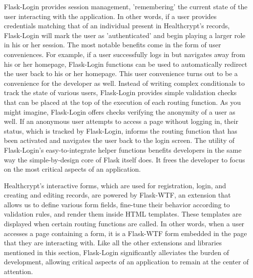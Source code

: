 \documentclass[letterpaper, 10pt,DIV=13]{scrartcl}
\begin{document}
\begin{multicols}{2}
\begin{spacing}{1.25}
Flask-Login provides session management, 'remembering' the current state of the user interacting with the application. In other words, if a user provides credentials matching that of an individual present in Healthcrypt's records, Flask-Login will mark the user as 'authenticated' and begin playing a larger role in his or her session. The most notable benefits come in the form of user conveniences. For example, if a user successfully logs in but navigates away from his or her homepage, Flask-Login functions can be used to automatically redirect the user back to his or her homepage. This user convenience turns out to be a convenience for the developer as well. Instead of writing complex conditionals to track the state of various users, Flask-Login provides simple validation checks that can be placed at the top of the execution of each routing function. As you might imagine, Flask-Login offers checks verifying the anonymity of a user as well. If an anonymous user attempts to access a page without logging in, their status, which is tracked by Flask-Login, informs the routing function that has been activated and navigates the user back to the login screen. The utility of Flask-Login's easy-to-integrate helper functions benefits developers in the same way the simple-by-design core of Flask itself does. It frees the developer to focus on the most critical aspects of an application.

Healthcrypt's interactive forms, which are used for registration, login, and creating and editing records, are powered by Flask-WTF, an extension that allows us to define various form fields, fine-tune their behavior according to validation rules, and render them inside HTML templates. These templates are displayed when certain routing functions are called. In other words, when a user accesses a page containing a form, it is a Flask-WTF form embedded in the page that they are interacting with. Like all the other extensions and libraries mentioned in this section, Flask-Login significantly alleviates the burden of development, allowing critical aspects of an application to remain at the center of attention.


\end{spacing}
\end{multicols}
\end{document}
